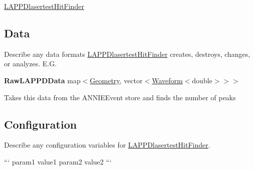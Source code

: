 \hyperlink{classLAPPDlasertestHitFinder}{L\-A\-P\-P\-Dlasertest\-Hit\-Finder}

\subsection*{Data}

Describe any data formats \hyperlink{classLAPPDlasertestHitFinder}{L\-A\-P\-P\-Dlasertest\-Hit\-Finder} creates, destroys, changes, or analyzes. E.\-G.

{\bfseries Raw\-L\-A\-P\-P\-D\-Data} {\ttfamily map$<$\hyperlink{classGeometry}{Geometry}, vector$<$\hyperlink{classWaveform}{Waveform}$<$double$>$$>$$>$}
\begin{DoxyItemize}
\item Takes this data from the {\ttfamily A\-N\-N\-I\-E\-Event} store and finds the number of peaks
\end{DoxyItemize}

\subsection*{Configuration}

Describe any configuration variables for \hyperlink{classLAPPDlasertestHitFinder}{L\-A\-P\-P\-Dlasertest\-Hit\-Finder}.

``` param1 value1 param2 value2 ``` 